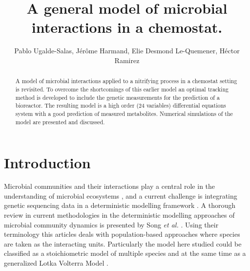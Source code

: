 \documentclass[3p,times]{elsarticle}
\begin{document}
\begin{frontmatter}



\dochead{}

\title{A general model of microbial interactions in a chemostat.}


\author{Pablo Ugalde-Salas, Jérôme Harmand, Elie Desmond Le-Quemener, Héctor Ramirez}

\address{}

\begin{abstract}
	A model of microbial interactions applied to a nitrifying process in a chemostat setting is revisited. To overcome the shortcomings of this earlier model an optimal tracking method is developed to include the genetic measurements for the prediction of a bioreactor. The resulting model is a high order (24 variables) differential equations system with a good prediction of measured metabolites. Numerical simulations of the model are presented and discussed.
\end{abstract}

\end{frontmatter}

\section{Introduction}


Microbial communities and their interactions play a central role in the understanding of microbial ecosystems \cite{West2007}, and a current challenge is integrating genetic sequencing data in a deterministic modelling framework \cite{Widder2016,WADE201664}. A thorough review in current methodologies in the deterministic modelling approaches of microbial community dynamics is presented by Song \textit{et al.} \cite{Song2014}. Using their terminology this articles deals with population-based approaches where species are taken as the interacting units. Particularly the model here studied could be classified as a stoichiometric model of multiple species and at the same time as a generalized Lotka Volterra Model \cite{Hernandez-Bermejo1997}.
\end{document}
